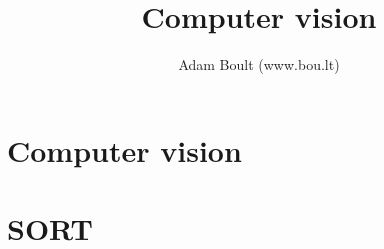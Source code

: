 \documentclass[oneside]{book}
\begin{document}
\author{Adam Boult (www.bou.lt)}
\title{Computer vision}
\maketitle

\setcounter{tocdepth}{0}
\tableofcontents



\part{Computer vision}





\part{SORT}

\end{document}
